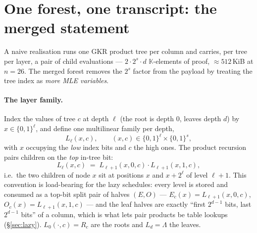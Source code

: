 \documentclass[11pt]{article}
\newcommand{\K}{\mathbb{K}}            %
\newcommand{\bits}{\{0,1\}}
\theoremstyle{definition}
\begin{document}
\section{One forest, one transcript: the merged statement}
\label{sec:merged}

A naive realisation runs one GKR product tree per column and carries,
per tree per layer, a pair of child evaluations --- $2\cdot 2^s\cdot d$
$\K$-elements of proof, ${\approx}512$\,KiB at $n = 26$.  The merged
forest removes the $2^s$ factor from the payload by treating the tree
index as \emph{more MLE variables}.

\paragraph{The layer family.}
Index the values of tree $c$ at depth $\ell$ (the root is depth $0$,
leaves depth $d$) by $x \in \bits^\ell$, and define one multilinear
family per depth,
\[
  L_\ell(x, c), \qquad (x, c) \in \bits^\ell \times \bits^s,
\]
with $x$ occupying the \emph{low} index bits and $c$ the high ones.
The product recursion pairs children on the \emph{top} in-tree bit:
\begin{equation}\label{eq:recursion}
  L_\ell(x, c) \;=\; L_{\ell+1}(x, 0, c)\cdot L_{\ell+1}(x, 1, c),
\end{equation}
i.e.\ the two children of node $x$ sit at positions $x$ and
$x + 2^{\ell}$ of level $\ell + 1$.  This convention is load-bearing for
the lazy schedules: every level is stored and consumed as a top-bit
split pair of halves $(E, O)$ ---
$E_c(x) = L_{\ell+1}(x, 0, c)$, $O_c(x) = L_{\ell+1}(x, 1, c)$ --- and
the leaf halves are exactly ``first $2^{d-1}$ bits, last $2^{d-1}$
bits'' of a column, which is what lets pair products be table lookups
(\S\ref{sec:lazy}).  $L_0(\cdot, c) = R_c$ are the roots and
$L_d = \Lambda$ the leaves.
\end{document}
